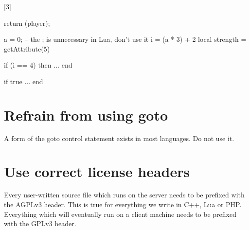 \documentclass[a4paper,11pt]{scrreprt}
\newcommand{\marginMarker}[1]{%
\marginnote{%
    \hfill%
		\Huge{#1}%
}[3\baselineskip]%
}
\newcommand{\nonconforming}{%
\marginMarker{\textcolor{red}{\ding{55}}}%
}
\begin{document}
\nonconforming{}
\begin{cppBox}
return (player);
\end{cppBox}
\begin{luaBox}[mathescape]
a = 0; -- the ; is unnecessary in Lua, don't use it
i = (a * 3) + 2
local strength = getAttribute(5)

if (i == 4) then
    $\dots$
end

if true
    $\dots$
end
\end{luaBox}

\section{Refrain from using goto}
A form of the goto control statement exists in most languages. Do not use it.

\section{Use correct license headers}
Every user-written source file which runs on the server needs to be prefixed with the AGPLv3 header. This is true for everything we write in C++, Lua or PHP. Everything which will eventually run on a client machine needs to be prefixed with the GPLv3 header.
\end{document}
